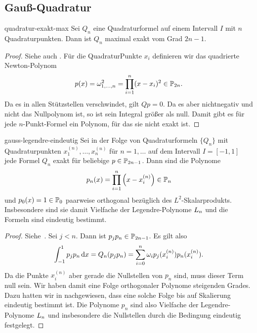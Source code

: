 \subsection{Gauß-Quadratur}

\begin{Lemma}{quadratur-exakt-max}
  Sei $Q_n$ eine Quadraturformel auf einem Intervall $I$ mit $n$
  Quadraturpunkten. Dann ist $Q_n$ maximal exakt vom Grad $2n-1$.
\end{Lemma}

\begin{proof}
  Siehe auch \cite[Satz 3.1]{Rannacher17}.  Für die QuadraturPunkte $x_i$
  definieren wir das quadrierte Newton-Polynom
  \begin{gather}
    p(x) = \omega_{1,\dots,n}^2 = \prod_{i=1}^n (x-x_i)^2 \in \P_{2n}.
  \end{gather}
  Da es in allen Stützstellen verschwindet, gilt $Q{p} = 0$. Da es
  aber nichtnegativ und nicht das Nullpolynom ist, so ist sein
  Integral größer als null. Damit gibt es für jede $n$-Punkt-Formel
  ein Polynom, für das sie nicht exakt ist.
\end{proof}

\begin{Satz}{gauss-legendre-eindeutig}
  Sei in der Folge von Quadraturformeln $\{Q_n\}$ mit Quadraturpunkten
  $x_1^{(n)},\dots,x_n^{(n)}$ für $n=1,\dots$ auf dem Intervall
  $I=[-1,1]$ jede Formel $Q_n$ exakt für beliebige $p\in
  \P_{2n-1}$. Dann sind die Polynome
  \begin{gather}
    p_n(x) = \prod_{i=1}^n \left(x-x_i^{(n)}\right) \in \P_n
  \end{gather}
  und $p_0(x) = 1 \in \P_0$ paarweise orthogonal bezüglich des
  $L^2$-Skalarprodukts. Insbesondere sind sie damit Vielfache der
  Legendre-Polynome $\plegendre_n$ und die Formeln sind eindeutig
  bestimmt.
\end{Satz}

\begin{proof}
  Siehe~\cite[Lemma 9.9 und 9.10]{DeuflhardHohmann08}.
  Sei $j<n$. Dann ist $p_jp_n\in \P_{2n-1}$. Es gilt also
  \begin{gather}
    \int_{-1}^1 p_jp_n \dx = Q_n(p_jp_n)
    = \sum_{i=0}^n \omega_i p_j(x_i^{(n)}) p_n(x_i^{(n)}).
  \end{gather}
  Da die Punkte $x_i^{(n)}$ aber gerade die Nullstellen von $p_n$
  sind, muss dieser Term null sein. Wir haben damit eine Folge
  orthogonaler Polynome steigenden Grades. Dazu hatten wir in
   nachgewiesen, dass eine solche Folge bis
  auf Skalierung eindeutig bestimmt ist. Die Polynome $p_n$ sind also
  Vielfache der Legendre-Polynome $\plegendre_n$ und insbesondere die
  Nullstellen durch die Bedingung eindeutig festgelegt.
\end{proof}

